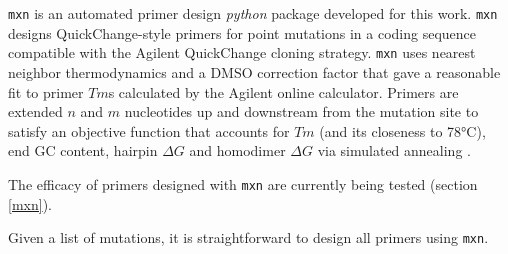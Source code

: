 \documentclass{article}
\begin{document}
\par
\texttt{mxn} is an automated primer design \textit{python} package developed for this work. \texttt{mxn} designs QuickChange-style primers for point mutations in a coding sequence compatible with the Agilent QuickChange cloning strategy. \texttt{mxn} uses nearest neighbor thermodynamics \cite{santalucia1998unified} and a DMSO correction factor \cite{von2001oligonucleotide} that gave a reasonable fit to primer $Tm$s calculated by the Agilent online calculator. Primers are extended $n$ and $m$ nucleotides up and downstream from the mutation site to satisfy an objective function that accounts for $Tm$ (and its closeness to 78°C), end GC content, hairpin $\Delta G$ and homodimer $\Delta G$ via simulated annealing \cite{kirkpatrick1983optimization}. %
\par
The efficacy of primers designed with \texttt{mxn} are currently being tested (section \ref{mxn}).
\par
Given a list of mutations, it is straightforward to design all primers using \texttt{mxn}.
\end{document}
